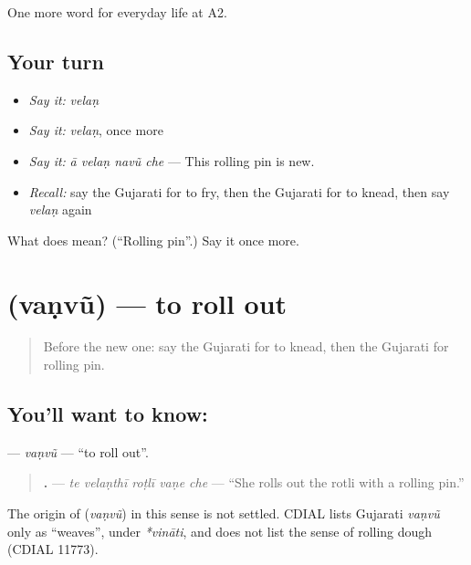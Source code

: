 \begin{grammarlens}[title={What you've built}]
One more word for everyday life at A2.
\end{grammarlens}

\subsection*{Your turn}
\begin{itemize}
\raggedright
  \item \emph{Say it:} \emph{velaṇ}
  \item \emph{Say it:} \emph{velaṇ}, once more
  \item \emph{Say it:} \emph{ā velaṇ navũ che} — This rolling pin is new.
  \item \emph{Recall:} say the Gujarati for to fry, then the Gujarati for to knead, then say \emph{velaṇ} again
\end{itemize}

\begin{tcolorbox}[breakable,colback=teal!4,colframe=teal!35!black,title={Before you move on}]
What does  mean? (\textquotedblleft{}Rolling pin\textquotedblright{}.) Say it once more.
\end{tcolorbox}
\section[\texorpdfstring{\gu{વણવું} (vaṇvũ)}{વણવું (vaṇvũ)}]{ (vaṇvũ) — to roll out}

\label{lesson:GU-C168-vanvu}



\begin{quote}
Before the new one: say the Gujarati for to knead, then the Gujarati for rolling pin.
\end{quote}

\subsection*{You'll want to know: }
\textbf{} — \emph{vaṇvũ} — \textquotedblleft{}to roll out\textquotedblright{}.

\begin{quote}
\textbf{    .} — \emph{te velaṇthī roṭlī vaṇe che} — \textquotedblleft{}She rolls out the rotli with a rolling pin.\textquotedblright{}
\end{quote}

\begin{cousinweb}
The origin of \textbf{} (\emph{vaṇvũ}) in this sense is not settled. CDIAL lists Gujarati \emph{vaṇvũ} only as \textquotedblleft{}weaves\textquotedblright{}, under \emph{*vināti}, and does not list the sense of rolling dough (CDIAL 11773).
\end{cousinweb}

